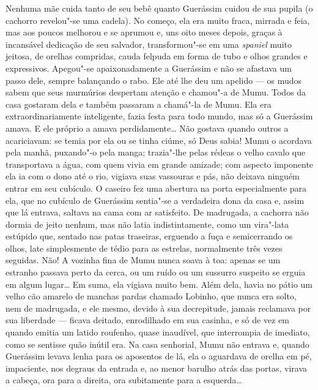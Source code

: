 Nenhuma mãe cuida tanto de seu bebê quanto Guerássim cuidou de sua
pupila (o cachorro revelou"-se uma cadela). No começo, ela era muito
fraca, mirrada e feia, mas aos poucos melhorou e se aprumou e, uns oito
meses depois, graças à incansável dedicação de seu salvador,
transformou"-se em uma \emph{spaniel} muito jeitosa, de orelhas
compridas, cauda felpuda em forma de tubo e olhos grandes e expressivos.
Apegou"-se apaixonadamente a Guerássim e não se afastava um passo dele,
sempre balançando o rabo. Ele até lhe deu um apelido --- os mudos sabem
que seus murmúrios despertam atenção e chamou"-a de Mumu. Todos da casa
gostaram dela e também passaram a chamá"-la de Mumu. Ela era
extraordinariamente inteligente, fazia festa para todo mundo, mas só a
Guerássim amava. E ele próprio a amava perdidamente\ldots{} Não gostava
quando outros a acariciavam: se temia por ela ou se tinha ciúme, só Deus
sabia! Mumu o acordava pela manhã, puxando"-o pela manga; trazia"-lhe
pelas rédeas o velho cavalo que transportava a água, com quem vivia em
grande amizade; com aspecto imponente ela ia com o dono até o rio,
vigiava suas vassouras e pás, não deixava ninguém entrar em seu
cubículo. O caseiro fez uma abertura na porta especialmente para ela,
que no cubículo de Guerássim sentia"-se a verdadeira dona da casa e, assim que lá entrava, saltava na cama com ar satisfeito.
De madrugada, a cachorra não dormia de jeito nenhum, mas não latia
indistintamente, como um vira"-lata estúpido que, sentado nas patas
traseiras, erguendo a fuça e semicerrando os olhos, late simplesmente de
tédio para as estrelas, normalmente três vezes seguidas. Não! A vozinha
fina de Mumu nunca soava à toa: apenas se um estranho passava perto da cerca,
ou um ruído ou um sussurro suspeito se erguia em algum lugar\ldots{} Em suma,
ela vigiava muito bem. Além dela, havia no pátio um velho cão amarelo de
manchas pardas chamado Lobinho, que nunca era solto, nem de madrugada, e
ele mesmo, devido à sua decrepitude, jamais reclamava por sua liberdade
--- ficava deitado, enrodilhado em sua casinha, e só de vez em quando
emitia um latido roufenho, quase inaudível, que interrompia de imediato,
como se sentisse quão inútil era. Na casa senhorial, Mumu não entrava e,
quando Guerássim levava lenha para os aposentos de lá, ela o aguardava de orelha em pé, impaciente, nos degraus da entrada e, ao menor barulho atrás das portas, virava a cabeça, ora para a direita, ora subitamente para a esquerda\ldots{}

